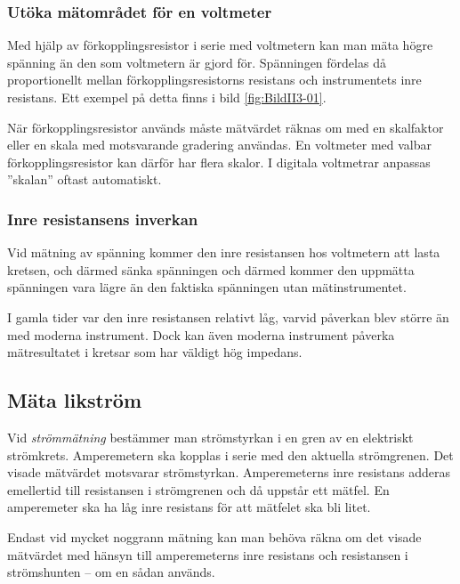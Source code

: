 
\subsubsection{Utöka mätområdet för en voltmeter}

Med hjälp av förkopplingsresistor i serie med voltmetern kan man mäta
högre spänning än den som voltmetern är gjord för.
Spänningen fördelas då proportionellt mellan förkopplingsresistorns resistans
och instrumentets inre resistans.
Ett exempel på detta finns i bild \ref{fig:BildII3-01}.

När förkopplingsresistor används måste mätvärdet räknas om med en
skalfaktor eller en skala med motsvarande gradering användas.
En voltmeter med valbar förkopplingsresistor kan därför har flera skalor.
I digitala voltmetrar anpassas ''skalan'' oftast automatiskt.

\subsubsection{Inre resistansens inverkan}

Vid mätning av spänning kommer den inre resistansen hos voltmetern att lasta
kretsen, och därmed sänka spänningen och därmed kommer den uppmätta spänningen
vara lägre än den faktiska spänningen utan mätinstrumentet.

I gamla tider var den inre resistansen relativt låg, varvid påverkan blev större
än med moderna instrument.
Dock kan även moderna instrument påverka mätresultatet i kretsar som har väldigt
hög impedans.

\subsection{Mäta likström}

Vid \emph{strömmätning} bestämmer man strömstyrkan i en gren av en elektriskt
strömkrets.
Amperemetern ska kopplas i serie med den aktuella strömgrenen.
Det visade mätvärdet motsvarar strömstyrkan.
Amperemeterns inre resistans adderas emellertid till resistansen i strömgrenen
och då uppstår ett mätfel.
En amperemeter ska ha låg inre resistans för att mätfelet ska bli litet.

Endast vid mycket noggrann mätning kan man behöva räkna om det visade
mätvärdet med hänsyn till amperemeterns inre resistans och resistansen
i strömshunten -- om en sådan används.

